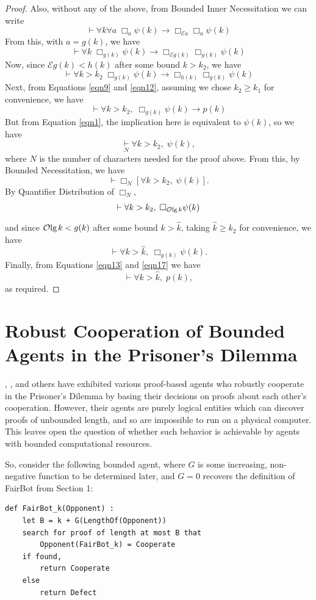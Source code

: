 \documentclass[onecolumn,authordate]{miri-tech-article}
\numberwithin{equation}{section}
\newcommand{\eqn}[1]{\begin{equation}#1\end{equation}}
\theoremstyle{definition}
\newcommand{\Ee}{\mathcal{E}}
\newcommand{\Oo}{\mathcal{O}}
\newcommand{\proves}[1]{\underset{#1}{\vdash}}
\newcommand{\bx}[1]{\Box_{#1}}
\renewcommand{\implies}{\rightarrow}
\renewcommand{\lg}{\mathrm{lg\hspace{0.3ex}}}
\renewcommand{\-}{^{-1}}
\begin{document}
\begin{proof}
{}
Also, without any of the above, from Bounded Inner Necessitation we can write
$$\proves{} \forall k \forall a \; \bx{a}\psi(k)\implies \bx{\Ee a}\bx{a}\psi(k)$$
From this, with $a=g(k)$, we have
$$\proves{} \forall k \; \bx{g(k)}\psi(k)\implies \bx{\Ee g(k)}\bx{g(k)}\psi(k)$$
Now, since $\Ee g(k) < h(k)$ after some bound $k>k_2$, we have
\eqn{\label{eqn12}
\proves{} \forall k > k_2 \; \bx{g(k)}\psi(k)\implies \bx{h(k)}\bx{g(k)}\psi(k)
}
Next, from Equations \ref{eqn9} and \ref{eqn12}, assuming we chose $k_2\geq k_1$ for convenience, we have
\eqn{\label{eqn13}
\proves{} \forall k>k_2,\; \bx{g(k)}\psi(k)\implies p(k)
}
But from Equation \ref{eqn1}, the implication here is equivalent to $\psi(k)$, so we have
$$ \proves{N} \forall k>k_2,\; \psi(k),$$
where $N$ is the number of characters needed for the proof above.  From this, by Bounded Necessitation, we have
$$\proves{} \bx{N} [\forall k>k_2,\; \psi(k)].$$
By Quantifier Distribution of $\bx{N}$,
$$\proves{} \forall k>k_2,\; \bx{\Oo\lg k} \psi(k)$$
and since $\Oo\lg k < g(k)$ after some bound $k>\hat k$, taking $\hat k \geq k_2$ for convenience, we have
\eqn{\label{eqn17}
\proves{}\forall k>\hat k,\; \bx{g(k)}\psi(k).
}
Finally, from Equations \ref{eqn13} and \ref{eqn17} we have
$$\proves{} \forall k>\hat k,\; p(k),$$
as required.
\end{proof}


\section{Robust Cooperation of Bounded Agents in the Prisoner's Dilemma}

\citet{Barasz:2014:RobustCooperation}, \citet{LaVictoire:2014:PrisDilemmaLob}, and others have exhibited various proof-based agents who robustly cooperate in the Prisoner's Dilemma by basing their decisions on proofs about each other's cooperation.  However, their agents are purely logical entities which can discover proofs of unbounded length, and so are impossible to run on a physical computer.  This leaves open the question of whether such behavior is achievable by agents with bounded computational resources.

So, consider the following bounded agent, where $G$ is some increasing, non-negative function to be determined later, and $G=0$ recovers the definition of FairBot from Section 1:

\begin{Verbatim}[frame=single]
def FairBot_k(Opponent) :
	let B = k + G(LengthOf(Opponent))
	search for proof of length at most B that 
		Opponent(FairBot_k) = Cooperate
	if found,
		return Cooperate
	else
		return Defect
\end{Verbatim}
\end{document}
